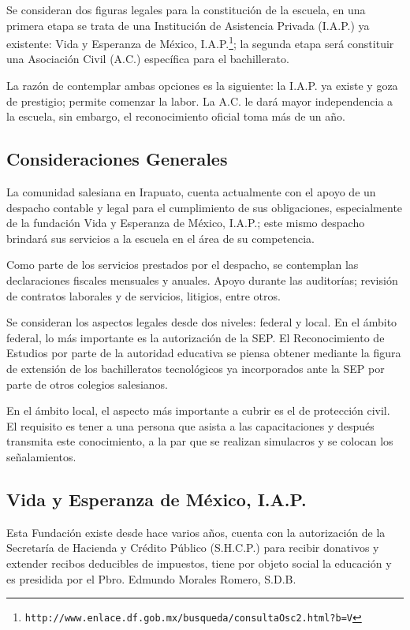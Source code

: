 Se consideran dos figuras legales para la constitución de la escuela, en una primera etapa se trata de una Institución de Asistencia Privada (I.A.P.) ya existente: Vida y Esperanza de México, I.A.P.\footnote{\texttt{http://www.enlace.df.gob.mx/busqueda/consultaOsc2.html?b=V}}; la segunda etapa será constituir una Asociación Civil (A.C.) específica para el bachillerato.

La razón de contemplar ambas opciones es la siguiente: la I.A.P. ya existe y goza de prestigio; permite comenzar la labor. La A.C. le dará mayor independencia a la escuela, sin embargo, el reconocimiento oficial toma más de un año.

\subsection{Consideraciones Generales}

La comunidad salesiana en Irapuato, cuenta actualmente con el apoyo de un despacho contable y legal para el cumplimiento de sus obligaciones, especialmente de la fundación Vida y Esperanza de México, I.A.P.; este mismo despacho brindará sus servicios a la escuela en el área de su competencia.

Como parte de los servicios prestados por el despacho, se contemplan las declaraciones fiscales mensuales y anuales. Apoyo durante las auditorías; revisión de contratos laborales y de servicios, litigios, entre otros.

Se consideran los aspectos legales desde dos niveles: federal y local. En el ámbito federal, lo más importante es la autorización de la SEP. El Reconocimiento de Estudios por parte de la autoridad educativa se piensa obtener mediante la figura de extensión de los bachilleratos tecnológicos ya incorporados ante la SEP por parte de otros colegios salesianos.

En el ámbito local, el aspecto más importante a cubrir es el de protección civil. El requisito es tener a una persona que asista a las capacitaciones y después transmita este conocimiento, a la par que se realizan simulacros y se colocan los señalamientos.

\subsection{Vida y Esperanza de México, I.A.P.}

Esta Fundación existe desde hace varios años, cuenta con la autorización de la Secretaría de Hacienda y Crédito Público (S.H.C.P.) para recibir donativos y extender recibos deducibles de impuestos, tiene por objeto social la educación y es presidida por el Pbro. Edmundo Morales Romero, S.D.B.

